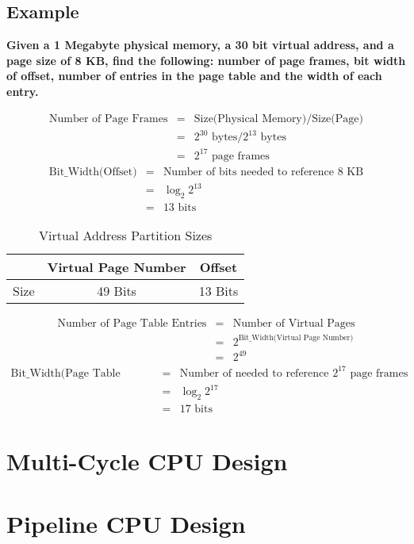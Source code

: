 \documentclass[11pt]{article}
\begin{document}
\subsection{Example}

\textbf{Given a 1 Megabyte physical memory, a 30 bit virtual address, and a page size of 8 KB, find the following: number of page frames, bit width of offset, number of entries in the page table and the width of each entry.}

\begin{eqnarray*}
	\text{Number of Page Frames} &=& \text{Size(Physical Memory)} / \text{Size(Page)}\\
		&=& 2^{30} \text{ bytes} / 2^{13} \text{ bytes}\\
		&=& 2^{17} \text{ page frames}
\end{eqnarray*}
\begin{eqnarray*}
	\text{Bit\_Width(Offset)} &=& \text{Number of bits needed to reference 8 KB}\\
	&=& \log_2 2^{13}\\
	&=& 13 \text{ bits}
\end{eqnarray*}
\begin{table}[H]
	\centering
	\caption*{Virtual Address Partition Sizes}
	\begin{tabular}{| c | c | c |}
		\hline
				&	Virtual Page Number	&	Offset\\
		\hline
		Size	&	49 Bits	&	13 Bits\\
		\hline
	\end{tabular}
\end{table}
\begin{eqnarray*}
	\text{Number of Page Table Entries} &=& \text{Number of Virtual Pages}\\
		&=& 2^{\text{Bit\_Width(Virtual Page Number)}}\\
		&=& 2^{49}
\end{eqnarray*}
\begin{eqnarray*}
	\text{Bit\_Width(Page Table Entry)} &=& \text{Number of needed to reference } 2^{17} \text{ page frames}\\
	&=& \log_2 2^{17}\\
	&=& 17 \text{ bits}
\end{eqnarray*}
\section{Multi-Cycle CPU Design}

\section{Pipeline CPU Design}
\end{document}
